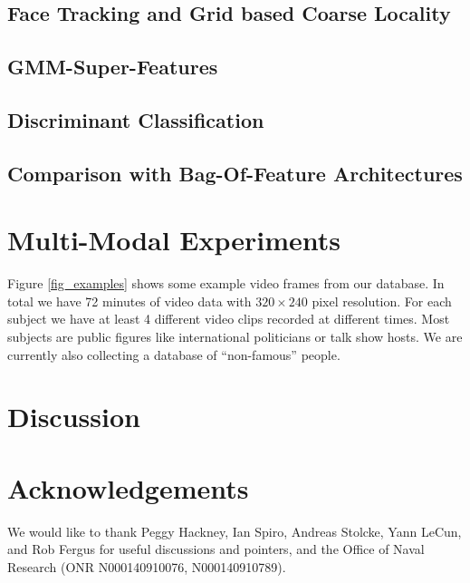 \documentclass[times, 10pt,twocolumn]{article}
\begin{document}
\subsection{Face Tracking and Grid based Coarse Locality}

\subsection{GMM-Super-Features}
\label{sec_superfeat}

\subsection{Discriminant Classification}

\subsection{Comparison with Bag-Of-Feature Architectures}
\label{sec_relatedbag}

\section{Multi-Modal Experiments}

Figure \ref{fig_examples}  shows some example video frames from our database.  In total we have 72 minutes of video data with $320 \times 240$ pixel resolution. For each subject we have at least 4 different video clips recorded at different times.   Most subjects are public figures like international politicians or talk show hosts.  We are currently also collecting a database of ``non-famous'' people.

\section{Discussion}


\section{Acknowledgements}
We would like to thank Peggy Hackney, Ian Spiro, Andreas Stolcke, Yann LeCun, and Rob Fergus for useful discussions and pointers, and the Office of Naval Research (ONR N000140910076, N000140910789).


{\tiny


}
\end{document}

